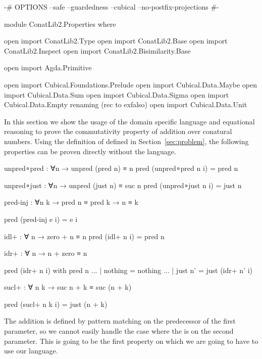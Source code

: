 \begin{code}[hide]
{-# OPTIONS --safe --guardedness --cubical --no-postfix-projections #-}

module ConatLib2.Properties where

open import ConatLib2.Type
open import ConatLib2.Base
open import ConatLib2.Inspect
open import ConatLib2.Bisimilarity.Base

open import Agda.Primitive

open import Cubical.Foundations.Prelude
open import Cubical.Data.Maybe
open import Cubical.Data.Sum
open import Cubical.Data.Sigma
open import Cubical.Data.Empty
  renaming (rec to exfalso)
open import Cubical.Data.Unit
\end{code}

In this section we show the usage of the domain specific language and
equational reasoning to prove the commutativity property of addition
over conatural numbers. Using the definition of \AgdaFunction{\_+\_}
defined in Section~\ref{sec:problem}, the following properties can be proven
directly without the language.

\begin{code}[hide]
unpred∘pred : ∀{n} → unpred (pred n) ≡ n
pred (unpred∘pred {n} i) = pred n

unpred∘just : ∀{n} → unpred (just n) ≡ suc n
pred (unpred∘just {n} i) = just n
\end{code}
\begin{code}
pred-inj : ∀{n k} → pred n ≡ pred k → n ≡ k
\end{code}
\begin{code}[hide]
pred (pred-inj e i) = e i
\end{code}
\begin{code}[hide]
idl+ : ∀ n → zero + n ≡ n
pred (idl+ n i) = pred n
\end{code}
\begin{code}
idr+ : ∀ n → n + zero ≡ n
\end{code}
\begin{code}[hide]
pred (idr+ n i) with pred n
... | nothing = nothing
... | just n' = just (idr+ n' i)
\end{code}
\begin{code}
sucl+ : ∀ n k → suc n + k ≡ suc (n + k)
\end{code}
\begin{code}[hide]
pred (sucl+ n k i) = just (n + k)
\end{code}

The addition is defined by pattern matching on the predecessor of the
first parameter, so we cannot easily handle the case where the 
is on the second parameter. This is going to be the first property on which
we are going to have to use our language.

